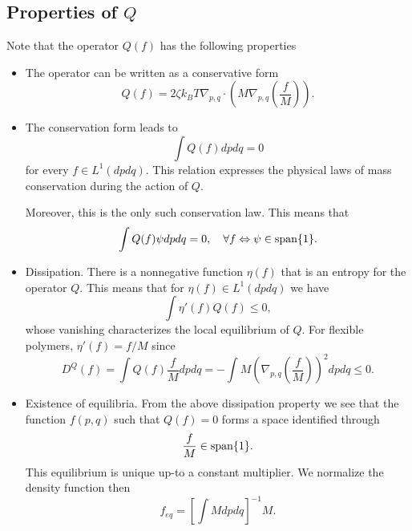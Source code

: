 \documentclass[reqno]{amsart}
\numberwithin{equation}{section}
\theoremstyle{definition}
\theoremstyle{remark}
\begin{document}
\subsection{Properties of $Q$}
Note that the operator $Q(f)$ has the following properties
\begin{itemize}
\item The operator can be written as a conservative form
$$
Q(f)=2 \zeta k_BT \nabla_{p, q}\cdot \left(M \nabla_{p, q}
\left(\frac{f}{M}\right)\right).
$$

\item The conservation form leads to
 $$\int Q(f)dpdq=0$$
 for every $f\in L^1(dpdq)$.  This relation expresses the physical laws of mass conservation
 during the action of $Q$.

Moreover, this is the only such conservation law. This means that
$$
\int Q(f)\psi dpdq=0, \quad \forall f \Leftrightarrow \psi \in {\rm
span} \{1\}.
$$
\item Dissipation. There is a nonnegative function $\eta(f)$ that is
an entropy for the operator $Q$. This means that for $\eta(f) \in
L^1(dpdq)$ we have
$$
\int \eta'(f) Q(f) \leq 0,
$$
whose vanishing characterizes the local equilibrium of $Q$. For
flexible polymers, $\eta'(f)=f/M$ since
$$
D^Q(f)=\int Q(f)\frac{f}{M}dpdq=-\int M\left( \nabla_{p, q}
\left(\frac{f}{M}\right)\right)^2dpdq \leq 0.
$$
\item Existence of equilibria.  From the above dissipation property we see that
the function $f(p, q)$ such that $Q(f)=0$ forms a space identified through
$$
 \frac{f}{M}\in {\rm span}\{1\}.
$$
This equilibrium is unique up-to a constant multiplier.  We
normalize the density function then
$$
f_{eq}=\left[\int Mdpdq \right]^{-1}M.
$$


\end{itemize}
\end{document}
